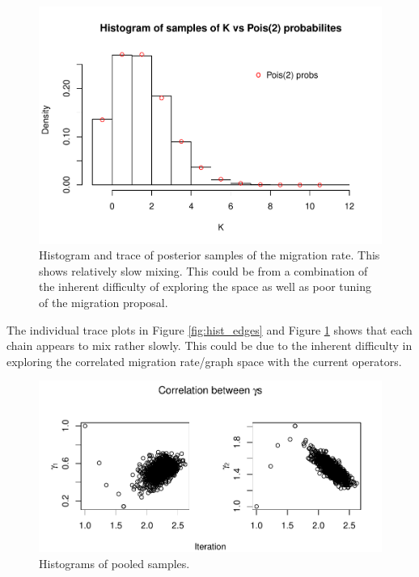 \documentclass[11pt,a4paper]{article}
\begin{document}
\begin{figure}
\centering
\includegraphics{thesis_draft_files/figure-latex/unnamed-chunk-3-1.pdf}
\caption{\label{fig:migration} Histogram and trace of posterior samples
of the migration rate. This shows relatively slow mixing. This could be
from a combination of the inherent difficulty of exploring the space as
well as poor tuning of the migration proposal.}
\end{figure}

The individual trace plots in Figure \ref{fig:hist_edges} and Figure
\ref{fig:migration} shows that each chain appears to mix rather slowly.
This could be due to the inherent difficulty in exploring the correlated
migration rate/graph space with the current operators.

\begin{figure}
\centering
\includegraphics{thesis_draft_files/figure-latex/unnamed-chunk-4-1.pdf}
\caption{\label{fig:pooled} Histograms of pooled samples.}
\end{figure}
\end{document}
